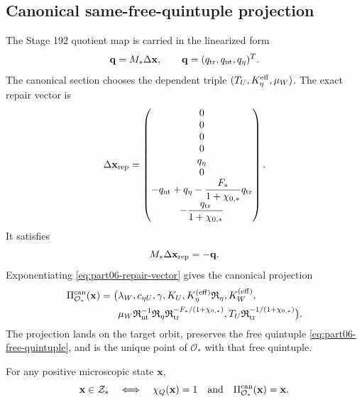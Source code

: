 \subsection{Canonical same-free-quintuple projection}
\label{subsec:part06-canonical-same-free-quintuple-projection}

The Stage 192 quotient map is carried in the linearized form
\begin{equation}
\label{eq:part06-Mstar-map}
\mathbf q=M_*\Delta\mathbf x,
\qquad
\mathbf q=(q_{\rm tr},q_{\rm nt},q_\eta)^T.
\end{equation}
The canonical section chooses the dependent triple \((T_U,K_\eta^{\rm eff},\mu_W)\).  The exact repair vector is
\begin{equation}
\label{eq:part06-repair-vector}
\Delta\mathbf x_{\rm rep}
=
\begin{pmatrix}
0\\
0\\
0\\
0\\
q_\eta\\
0\\
-q_{\rm nt}+q_\eta-\dfrac{F_*}{1+\chi_{0,*}}q_{\rm tr}\\[6pt]
-\dfrac{q_{\rm tr}}{1+\chi_{0,*}}
\end{pmatrix}.
\end{equation}
It satisfies
\begin{equation}
\label{eq:part06-repair-cancels-q}
M_*\Delta\mathbf x_{\rm rep}=-\mathbf q.
\end{equation}
Exponentiating \eqref{eq:part06-repair-vector} gives the canonical projection
\begin{equation}
\label{eq:part06-canonical-projection}
\begin{aligned}
\Pi_{\mathcal O_*}^{\rm can}(\mathbf x)
=\bigl(&
\lambda_W,
 c_{\eta U},
 \gamma,
 K_U,
 K_\eta^{(\mathrm{eff})}\mathfrak R_\eta,
 K_W^{(\mathrm{eff})},\\
&\mu_W\mathfrak R_{\rm nt}^{-1}\mathfrak R_\eta\mathfrak R_{\rm tr}^{-F_* /(1+\chi_{0,*})},
 T_U\mathfrak R_{\rm tr}^{-1/(1+\chi_{0,*})}
\bigr).
\end{aligned}
\end{equation}
The projection lands on the target orbit, preserves the free quintuple \eqref{eq:part06-free-quintuple}, and is the unique point of \(\mathcal O_*\) with that free quintuple.

\begin{proposition}
\label{prop:part06-canonical-fixed-point-audit}
For any positive microscopic state \(\mathbf x\),
\begin{equation}
\label{eq:part06-canonical-fixed-point}
\mathbf x\in\mathcal Z_*
\quad\Longleftrightarrow\quad
\chi_Q(\mathbf x)=1
\quad\text{and}\quad
\Pi_{\mathcal O_*}^{\rm can}(\mathbf x)=\mathbf x.
\end{equation}
\end{proposition}

